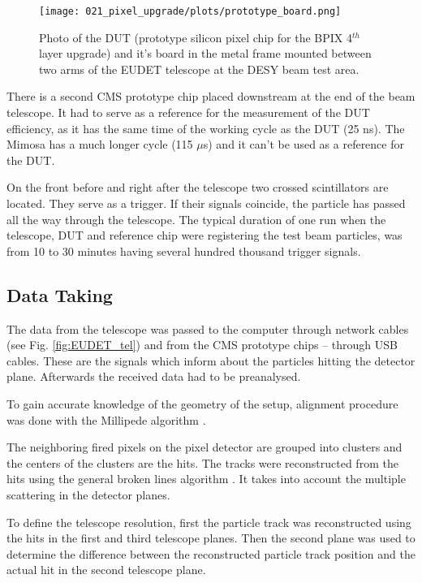 \begin{figure}[t]
 \centering
 \texttt{[image: 021\_pixel\_upgrade/plots/prototype\_board.png]}
 \caption{Photo of the DUT (prototype silicon pixel chip for the BPIX 4$^{th}$ layer upgrade) and it's board in the metal frame
 mounted between two arms of the EUDET telescope at the DESY beam test area.}
 \label{fig:prototype_board}
\end{figure}

There is a second CMS prototype chip placed downstream at the end of the beam telescope. It had to serve as a reference for the
measurement of the DUT efficiency, as it has the same time of the working cycle as the DUT (25 ns). The Mimosa has a much longer
cycle (115 $\mu$s) and it can't be used as a reference for the DUT.

On the front before and right after the telescope two crossed scintillators are located. They serve as a trigger. 
If their signals coincide, the particle has passed all the way through the telescope.
The typical duration of one run when the telescope, DUT and reference chip were registering the test beam particles, was from 10
to 30 minutes having several hundred thousand trigger signals.

\subsection{Data Taking}

The data from the telescope was passed to the computer through network cables (see Fig. \ref{fig:EUDET_tel}) and from
the CMS prototype chips -- through USB cables. These are the signals which inform
about the particles hitting the detector plane.  Afterwards the received data had to be preanalysed. 

To gain accurate knowledge of the geometry of the setup, alignment procedure was done with the Millipede algorithm 
\cite{1748-0221-3-09-P09002}.

The neighboring fired pixels on the pixel detector are grouped into clusters and the centers of the clusters are the hits.
The tracks were reconstructed from the hits using the general broken lines algorithm \cite{Blobel:2006yi}. It takes into
account the multiple scattering in the detector planes. 

To define the telescope resolution, first the particle track was reconstructed using the hits in the first and third telescope planes.
Then the second plane was used to determine the difference between the reconstructed particle track position and the actual hit in the 
second telescope plane.

